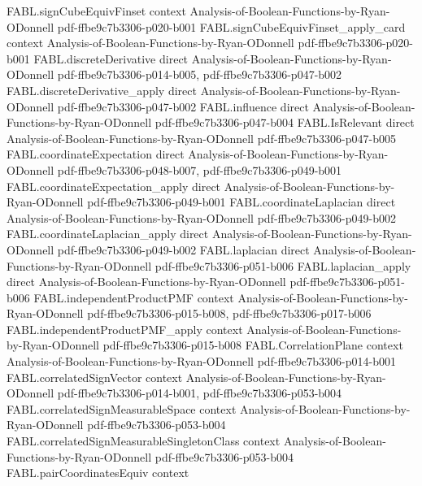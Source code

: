 \begin{theorem}
  {FABL.signCubeEquivFinset}
  {context}
  {Analysis-of-Boolean-Functions-by-Ryan-ODonnell}
  {pdf-ffbe9c7b3306-p020-b001}
\proofstep
  {FABL.signCubeEquivFinset_apply_card}
  {context}
  {Analysis-of-Boolean-Functions-by-Ryan-ODonnell}
  {pdf-ffbe9c7b3306-p020-b001}
\proofstep
  {FABL.discreteDerivative}
  {direct}
  {Analysis-of-Boolean-Functions-by-Ryan-ODonnell}
  {pdf-ffbe9c7b3306-p014-b005,
    pdf-ffbe9c7b3306-p047-b002}
\proofstep
  {FABL.discreteDerivative_apply}
  {direct}
  {Analysis-of-Boolean-Functions-by-Ryan-ODonnell}
  {pdf-ffbe9c7b3306-p047-b002}
\proofstep
  {FABL.influence}
  {direct}
  {Analysis-of-Boolean-Functions-by-Ryan-ODonnell}
  {pdf-ffbe9c7b3306-p047-b004}
\proofstep
  {FABL.IsRelevant}
  {direct}
  {Analysis-of-Boolean-Functions-by-Ryan-ODonnell}
  {pdf-ffbe9c7b3306-p047-b005}
\proofstep
  {FABL.coordinateExpectation}
  {direct}
  {Analysis-of-Boolean-Functions-by-Ryan-ODonnell}
  {pdf-ffbe9c7b3306-p048-b007,
    pdf-ffbe9c7b3306-p049-b001}
\proofstep
  {FABL.coordinateExpectation_apply}
  {direct}
  {Analysis-of-Boolean-Functions-by-Ryan-ODonnell}
  {pdf-ffbe9c7b3306-p049-b001}
\proofstep
  {FABL.coordinateLaplacian}
  {direct}
  {Analysis-of-Boolean-Functions-by-Ryan-ODonnell}
  {pdf-ffbe9c7b3306-p049-b002}
\proofstep
  {FABL.coordinateLaplacian_apply}
  {direct}
  {Analysis-of-Boolean-Functions-by-Ryan-ODonnell}
  {pdf-ffbe9c7b3306-p049-b002}
\proofstep
  {FABL.laplacian}
  {direct}
  {Analysis-of-Boolean-Functions-by-Ryan-ODonnell}
  {pdf-ffbe9c7b3306-p051-b006}
\proofstep
  {FABL.laplacian_apply}
  {direct}
  {Analysis-of-Boolean-Functions-by-Ryan-ODonnell}
  {pdf-ffbe9c7b3306-p051-b006}
\proofstep
  {FABL.independentProductPMF}
  {context}
  {Analysis-of-Boolean-Functions-by-Ryan-ODonnell}
  {pdf-ffbe9c7b3306-p015-b008,
    pdf-ffbe9c7b3306-p017-b006}
\proofstep
  {FABL.independentProductPMF_apply}
  {context}
  {Analysis-of-Boolean-Functions-by-Ryan-ODonnell}
  {pdf-ffbe9c7b3306-p015-b008}
\proofstep
  {FABL.CorrelationPlane}
  {context}
  {Analysis-of-Boolean-Functions-by-Ryan-ODonnell}
  {pdf-ffbe9c7b3306-p014-b001}
\proofstep
  {FABL.correlatedSignVector}
  {context}
  {Analysis-of-Boolean-Functions-by-Ryan-ODonnell}
  {pdf-ffbe9c7b3306-p014-b001,
    pdf-ffbe9c7b3306-p053-b004}
\proofstep
  {FABL.correlatedSignMeasurableSpace}
  {context}
  {Analysis-of-Boolean-Functions-by-Ryan-ODonnell}
  {pdf-ffbe9c7b3306-p053-b004}
\proofstep
  {FABL.correlatedSignMeasurableSingletonClass}
  {context}
  {Analysis-of-Boolean-Functions-by-Ryan-ODonnell}
  {pdf-ffbe9c7b3306-p053-b004}
\proofstep
  {FABL.pairCoordinatesEquiv}
  {context}

\end{theorem}
